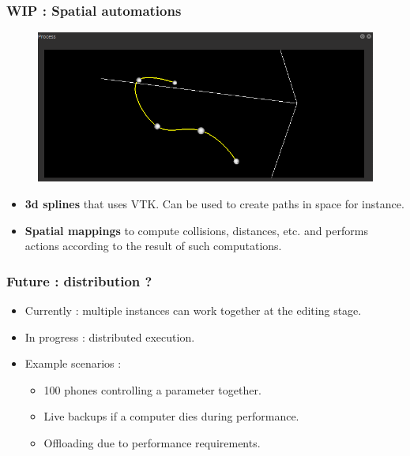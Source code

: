 \documentclass{beamer}
\begin{document}
    \begin{frame}
        \frametitle{WIP : Spatial automations}
        
        \begin{figure}
        	\centering
        	\includegraphics[width=\textwidth]{images/autom3d.png}
        \end{figure}   
        
        \begin{itemize}
        	\item \textbf{3d splines} that uses VTK. Can be used to create paths in space for instance.
        	\item \textbf{Spatial mappings} to compute collisions, distances, etc. and performs actions according to the result of such computations.
        \end{itemize}
    \end{frame}
    

\begin{frame}
    \frametitle{Future : distribution ?}
    
    \Large
    \begin{itemize}
        \setlength\itemsep{1em}
    	\item Currently : multiple instances can work together at the editing stage.
    	\item In progress : distributed execution.
    	\item Example scenarios :
    	\begin{itemize}
    		\item \large  100 phones controlling a parameter together.
    		\item Live backups if a computer dies during performance.
    		\item Offloading due to performance requirements.
    	\end{itemize}
    	 
    \end{itemize}
\end{frame}
\end{document}
